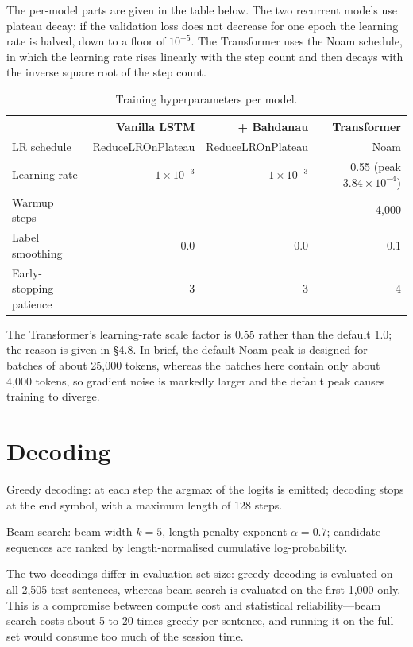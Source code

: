 \documentclass[a4paper,12pt]{vpcoe}
\begin{document}
The per-model parts are given in the table below. The two recurrent models use plateau decay: if the validation loss does not decrease for one epoch the learning rate is halved, down to a floor of $10^{-5}$. The Transformer uses the Noam schedule, in which the learning rate rises linearly with the step count and then decays with the inverse square root of the step count.

\begin{table}[h]
\centering
\caption{Training hyperparameters per model.}
\label{tab:hparams}
\begin{tabular}{@{}lrrr@{}}
\toprule
 & Vanilla LSTM & + Bahdanau & Transformer \\
\midrule
LR schedule & ReduceLROnPlateau & ReduceLROnPlateau & Noam \\
Learning rate & $1\times10^{-3}$ & $1\times10^{-3}$ & 0.55 (peak $3.84\times10^{-4}$) \\
Warmup steps & --- & --- & 4,000 \\
Label smoothing & 0.0 & 0.0 & 0.1 \\
Early-stopping patience & 3 & 3 & 4 \\
\bottomrule
\end{tabular}

\vspace{2pt}
{\footnotesize The Transformer's learning-rate scale factor is 0.55 rather than the default 1.0; the reason is given in \S 4.8. In brief, the default Noam peak is designed for batches of about 25,000 tokens, whereas the batches here contain only about 4,000 tokens, so gradient noise is markedly larger and the default peak causes training to diverge.}
\end{table}

\section{Decoding}
Greedy decoding: at each step the argmax of the logits is emitted; decoding stops at the end symbol, with a maximum length of 128 steps.

Beam search: beam width $k=5$, length-penalty exponent $\alpha=0.7$; candidate sequences are ranked by length-normalised cumulative log-probability.

The two decodings differ in evaluation-set size: greedy decoding is evaluated on all 2,505 test sentences, whereas beam search is evaluated on the first 1,000 only. This is a compromise between compute cost and statistical reliability---beam search costs about 5 to 20 times greedy per sentence, and running it on the full set would consume too much of the session time.
\end{document}
